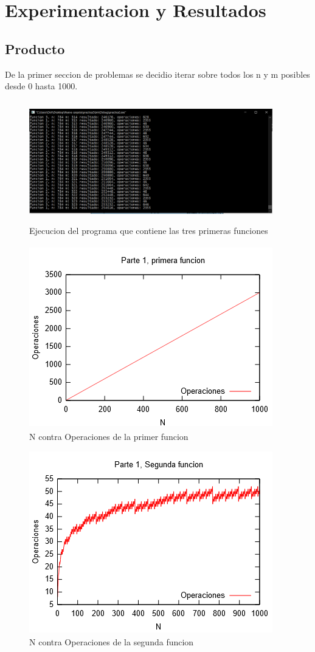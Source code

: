 \documentclass[spanish]{article}
\begin{document}
	\section{Experimentacion y Resultados}
		\subsection{Producto}
			De la primer seccion de problemas se decidio iterar sobre todos los n y m posibles desde 0 hasta 1000.\\
			\begin{figure}[h!]
				\centering
				\includegraphics[width=400px,height=200px]{ejecucionPrimeraParte}
				\caption{Ejecucion del programa que contiene las tres primeras funciones}
			\end{figure}
			\begin{figure}[h!]
				\centering
				\includegraphics[width=400px,height=300px]{grafica1}
				\caption{N contra Operaciones de la primer funcion}
			\end{figure}
			\begin{figure}[H]
				\centering
				\includegraphics[width=400px,height=300px]{grafica2}
				\caption{N contra Operaciones de la segunda funcion}
			\end{figure}
\end{document}
